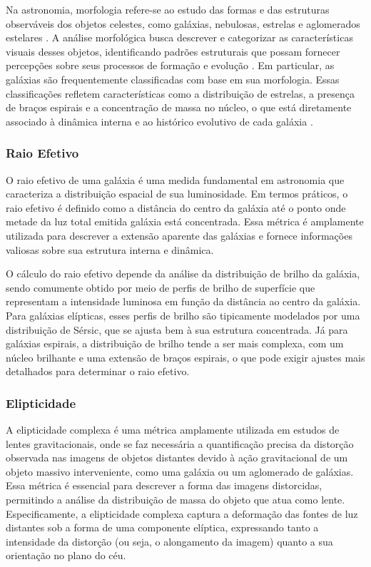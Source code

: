 Na astronomia, morfologia refere-se ao estudo das formas e das estruturas observáveis dos objetos celestes, como galáxias, nebulosas, estrelas e aglomerados estelares \citep{buta2011galaxy}. A análise morfológica busca descrever e categorizar as características visuais desses objetos, identificando padrões estruturais que possam fornecer percepções sobre seus processos de formação e evolução \citep{steinmetz2002galaxy}. Em particular, as galáxias são frequentemente classificadas com base em sua morfologia. Essas classificações refletem características como a distribuição de estrelas, a presença de braços espirais e a concentração de massa no núcleo, o que está diretamente associado à dinâmica interna e ao histórico evolutivo de cada galáxia \citep{van1998galaxy}.

\subsubsection{Raio Efetivo}
\label{sec:raio-efetivo}

O raio efetivo de uma galáxia é uma medida fundamental em astronomia que caracteriza a distribuição espacial de sua luminosidade. Em termos práticos, o raio efetivo é definido como a distância do centro da galáxia até o ponto onde metade da luz total emitida galáxia está concentrada. Essa métrica é amplamente utilizada para descrever a extensão aparente das galáxias e fornece informações valiosas sobre sua estrutura interna e dinâmica.

O cálculo do raio efetivo depende da análise da distribuição de brilho da galáxia, sendo comumente obtido por meio de perfis de brilho de superfície que representam a intensidade luminosa em função da distância ao centro da galáxia. Para galáxias elípticas, esses perfis de brilho são tipicamente modelados por uma distribuição de Sérsic, que se ajusta bem à sua estrutura concentrada. Já para galáxias espirais, a distribuição de brilho tende a ser mais complexa, com um núcleo brilhante e uma extensão de braços espirais, o que pode exigir ajustes mais detalhados para determinar o raio efetivo.

\subsubsection{Elipticidade}
\label{sec:elipticidade}

A elipticidade complexa é uma métrica amplamente utilizada em estudos de lentes gravitacionais, onde se faz necessária a quantificação precisa da distorção observada nas imagens de objetos distantes devido à ação gravitacional de um objeto massivo interveniente, como uma galáxia ou um aglomerado de galáxias. Essa métrica é essencial para descrever a forma das imagens distorcidas, permitindo a análise da distribuição de massa do objeto que atua como lente. Especificamente, a elipticidade complexa captura a deformação das fontes de luz distantes sob a forma de uma componente elíptica, expressando tanto a intensidade da distorção (ou seja, o alongamento da imagem) quanto a sua orientação no plano do céu.

